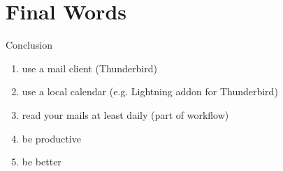 \documentclass{beamer}
\begin{document}
	\section*{Final Words}
	\begin{frame}{Conclusion}
		\begin{enumerate}
			\item<1-> use a mail client (Thunderbird)
			\item<2-> use a local calendar (e.g. Lightning addon for Thunderbird)
			\item<3-> read your mails at least daily (part of workflow)
			\item<4-> be productive
			\item<5> be better
		\end{enumerate}
	\end{frame}
\end{document}
